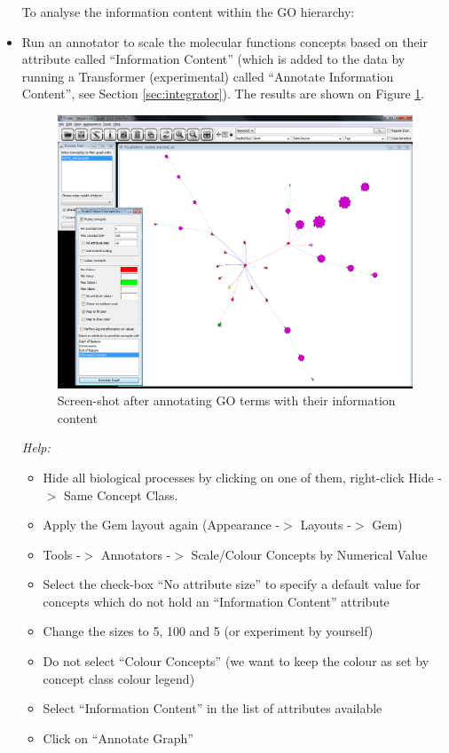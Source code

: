 \begin{itemize}
To analyse the information content within the GO hierarchy:
\item Run an annotator to scale the molecular functions concepts based on their attribute called ``Information Content''
(which is added to the data by running a Transformer (experimental) called ``Annotate Information Content'', see Section \ref{sec:integrator}). The results are shown on Figure \ref{fig:poplar_result_annIC}. 

\begin{figure}[H]
\centering
\includegraphics[scale=0.3]{images/Jun12/poplar_result_ex2_annIC.png} 
\caption{Screen-shot after annotating GO terms with their information content}
\label{fig:poplar_result_annIC}
\end{figure}

\emph{Help:}
	\begin{itemize}
	\item Hide all biological processes by clicking on one of them, right-click Hide -$>$ Same Concept Class.
	\item Apply the Gem layout again (Appearance -$>$ Layouts -$>$ Gem)
	\item Tools -$>$ Annotators -$>$ Scale/Colour Concepts by Numerical Value
	\item Select the check-box ``No attribute size'' to specify a default value for concepts which do not hold an ``Information Content'' attribute
	\item Change the sizes to 5, 100 and 5 (or experiment by yourself)
	\item Do not select ``Colour Concepts'' (we want to keep the colour as set by concept class colour legend)
	\item Select ``Information Content'' in the list of attributes available
	\item Click on ``Annotate Graph''
	\end{itemize}
\end{itemize}

